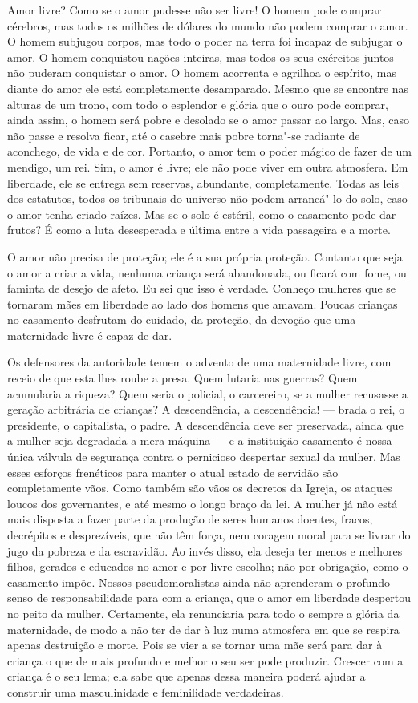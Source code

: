 Amor livre? Como se o amor pudesse não ser livre! O homem pode comprar
cérebros, mas todos os milhões de dólares do mundo não podem comprar o
amor. O homem subjugou corpos, mas todo o poder na terra foi incapaz de
subjugar o amor. O homem conquistou nações inteiras, mas todos os seus
exércitos juntos não puderam conquistar o amor. O homem acorrenta e
agrilhoa o espírito, mas diante do amor ele está completamente
desamparado. Mesmo que se encontre nas alturas de um trono, com todo o
esplendor e glória que o ouro pode comprar, ainda assim, o homem será
pobre e desolado se o amor passar ao largo. Mas, caso não passe e resolva
ficar, até o casebre mais pobre torna"-se radiante de aconchego, de vida
e de cor. Portanto, o amor tem o poder mágico de fazer de um mendigo, um
rei. Sim, o amor é livre; ele não pode viver em outra atmosfera. Em
liberdade, ele se entrega sem reservas, abundante, completamente.
Todas as leis dos estatutos, todos os tribunais do universo não podem
arrancá"-lo do solo, caso o amor tenha criado raízes. Mas se o solo é
estéril, como o casamento pode dar frutos? É como a luta desesperada e
última entre a vida passageira e a morte.

O amor não precisa de proteção; ele é a sua própria proteção. Contanto
que seja o amor a criar a vida, nenhuma criança será abandonada, ou
ficará com fome, ou faminta de desejo de afeto. Eu sei que isso é
verdade. Conheço mulheres que se tornaram mães em liberdade ao lado dos
homens que amavam. Poucas crianças no casamento desfrutam do cuidado, da
proteção, da devoção que uma maternidade livre é capaz de dar.

Os defensores da autoridade temem o advento de uma maternidade livre,
com receio de que esta lhes roube a presa. Quem lutaria nas guerras?
Quem acumularia a riqueza? Quem seria o policial, o carcereiro, se a
mulher recusasse a geração arbitrária de crianças? A descendência, a
descendência! --- brada o rei, o presidente, o capitalista, o padre. A
descendência deve ser preservada, ainda que a mulher seja degradada a
mera máquina --- e a instituição casamento é nossa única válvula de
segurança contra o pernicioso despertar sexual da mulher. Mas esses
esforços frenéticos para manter o atual estado de servidão são completamente vãos.
Como também são vãos os decretos da Igreja, os ataques loucos dos
governantes, e até mesmo o longo braço da lei. A mulher já não está
mais disposta a fazer parte da produção de seres humanos doentes, fracos,
decrépitos e desprezíveis, que não têm força, nem coragem moral para
se livrar do jugo da pobreza e da escravidão. Ao invés disso, ela deseja
ter menos e melhores filhos, gerados e educados no amor e por livre
escolha; não por obrigação, como o casamento impõe. Nossos
pseudomoralistas ainda não aprenderam o profundo senso de
responsabilidade para com a criança, que o amor em liberdade despertou
no peito da mulher. Certamente, ela renunciaria para todo o sempre a glória
da maternidade, de modo a não ter de dar à luz numa atmosfera em que se
respira apenas destruição e morte. Pois se vier a se tornar uma mãe
será para dar à criança o que de mais profundo e melhor o seu ser pode
produzir. Crescer com a criança é o seu lema; ela sabe que apenas dessa
maneira poderá ajudar a construir uma masculinidade e feminilidade
verdadeiras.

